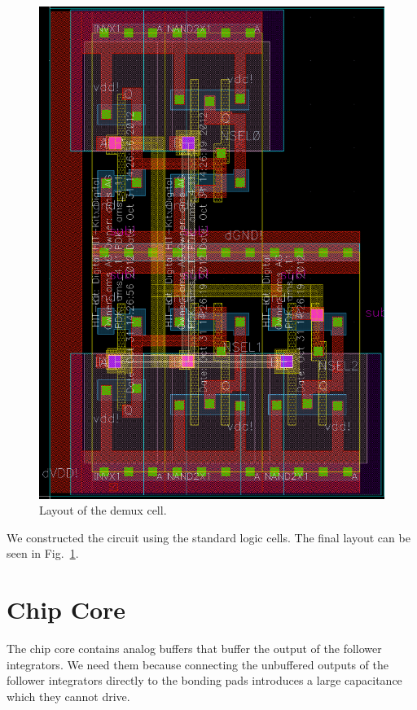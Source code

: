 \begin{figure}
    \center
    \includegraphics{demux_layout.png}
    \caption{Layout of the demux cell.}
    \label{fig:demux_layout}
\end{figure}
We constructed the circuit using the standard logic cells. The final layout can be seen in Fig.~\ref{fig:demux_layout}.

\section{Chip Core}
The chip core contains analog buffers that buffer the output of the follower integrators. We need them because connecting
the unbuffered outputs of the follower integrators directly to the bonding pads introduces a large capacitance which they
cannot drive.

